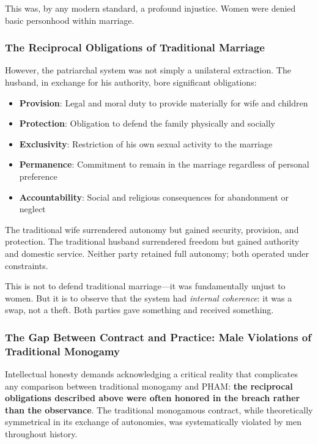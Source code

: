 \documentclass[12pt, letterpaper]{article}
\begin{document}
This was, by any modern standard, a profound injustice. Women were denied basic personhood within marriage.

\subsubsection{The Reciprocal Obligations of Traditional Marriage}

However, the patriarchal system was not simply a unilateral extraction. The husband, in exchange for his authority, bore significant obligations:

\begin{itemize}
    \item \textbf{Provision}: Legal and moral duty to provide materially for wife and children
    \item \textbf{Protection}: Obligation to defend the family physically and socially
    \item \textbf{Exclusivity}: Restriction of his own sexual activity to the marriage
    \item \textbf{Permanence}: Commitment to remain in the marriage regardless of personal preference
    \item \textbf{Accountability}: Social and religious consequences for abandonment or neglect
\end{itemize}

The traditional wife surrendered autonomy but gained security, provision, and protection. The traditional husband surrendered freedom but gained authority and domestic service. Neither party retained full autonomy; both operated under constraints.

This is not to defend traditional marriage---it was fundamentally unjust to women. But it is to observe that the system had \textit{internal coherence}: it was a swap, not a theft. Both parties gave something and received something.

\subsubsection{The Gap Between Contract and Practice: Male Violations of Traditional Monogamy}

Intellectual honesty demands acknowledging a critical reality that complicates any comparison between traditional monogamy and PHAM: \textbf{the reciprocal obligations described above were often honored in the breach rather than the observance}. The traditional monogamous contract, while theoretically symmetrical in its exchange of autonomies, was systematically violated by men throughout history.
\end{document}
